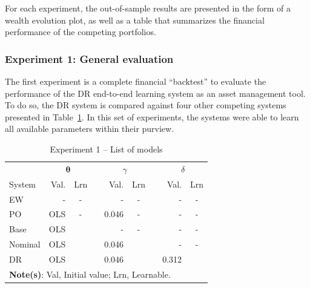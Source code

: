 \documentclass[10pt, twocolumn]{article}
\newcommand{\cmark}{\ding{51}}%
\theoremstyle{plain}
\theoremstyle{definition}
\begin{document}
For each experiment, the out-of-sample results are presented in the form of 
a wealth evolution plot, as well as a table that summarizes the financial 
performance of the competing portfolios.

\subsubsection{Experiment 1: General evaluation}\label{sec:gen_eval}

The first experiment is a
complete financial ``backtest'' to evaluate 
the performance of the DR end-to-end learning system as an asset management 
tool. To do so, the DR system is compared against four other competing
systems presented in Table~\ref{table:exp1_models}.
In this set of experiments, the systems
were able to learn all available parameters within their purview.

\begin{table}[t]
\caption{Experiment 1 -- List of models}
\centering
\begin{tabular}{lrcr@{}rcr@{}rc}
\toprule
		& \multicolumn{2}{c}{\(\bm{\theta}\)} & & \multicolumn{2}{c}{\(\gamma\)} & & \multicolumn{2}{c}{\(\delta\)}\\[0.5ex] \cline{2-3} \cline{5-6} \cline{8-9}
\rule{0pt}{3ex}System 	& Val. 	& Lrn    && Val. & Lrn 	  && Val. & Lrn \\
\midrule
EW 		& - 	& -      && -     & -      && -     & -      \\[0.5ex]
PO 		& OLS 	& -      && 0.046 & -      && -     & -      \\[0.5ex]
Base	& OLS 	& \cmark && -     & -      && -     & -      \\[0.5ex]
Nominal & OLS 	& \cmark && 0.046 & \cmark && -     & -      \\[0.5ex]
DR		& OLS 	& \cmark && 0.046 & \cmark && 0.312 & \cmark \\[0.25ex]
\bottomrule
\multicolumn{9}{p{0.9\linewidth}}{\small\rule{0pt}{3ex}\textbf{Note(s)}: Val, Initial value; Lrn, Learnable.}\\
\end{tabular}
\label{table:exp1_models}
\end{table}
\end{document}
